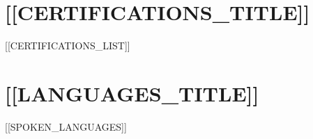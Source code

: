 \documentclass[letterpaper,11pt]{article}
\begin{document}
\section{[[CERTIFICATIONS_TITLE]]}
 \begin{itemize}[leftmargin=0.15in, label={}]
    \small{\item{
     [[CERTIFICATIONS_LIST]]
    }}
 \end{itemize}

\section{[[LANGUAGES_TITLE]]}
 \begin{itemize}[leftmargin=0.15in, label={}]
    \small{\item{
     [[SPOKEN_LANGUAGES]]
    }}
 \end{itemize}
\end{document}
